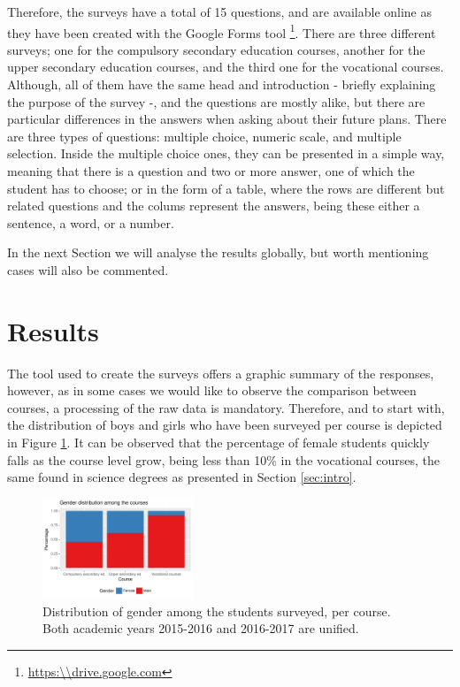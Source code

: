 \documentclass[journal,transmag]{IEEEtran}
\begin{document}
Therefore, the surveys have a total of 15 questions, and are available online as they have been created with the Google Forms tool \footnote{\url{https:\\drive.google.com}}. There are three different surveys; one for the compulsory secondary education courses, another for the upper secondary education courses, and the third one for the vocational courses. Although, all of them have the same head and introduction - briefly explaining the purpose of the survey -\cite{cohen2013research}, and the questions are mostly alike, but there are particular differences in the answers when asking about their future plans. There are three types of questions: multiple choice, numeric scale, and multiple selection. Inside the multiple choice ones, they can be presented in a simple way, meaning that there is a question and two or more answer, one of which the student has to choose; or in the form of a table, where the rows are different but related questions and the colums represent the answers, being these either a sentence, a word, or a number.

In the next Section we will analyse the results globally, but worth mentioning cases will also be commented.

\section{Results}
\label{sec:results}

The tool used to create the surveys offers a graphic summary of the responses, however, as in some cases we would like to observe the comparison between courses, a processing of the raw data is mandatory. Therefore, and to start with, the distribution of boys and girls who have been surveyed per course is depicted in Figure \ref{fig:alumni}. It can be observed that the percentage of female students quickly falls as the course level grow, being less than 10\% in the vocational courses, the same found in science degrees as presented in Section \ref{sec:intro}.

\begin{figure}
  \centering
  \includegraphics[width=0.4\textwidth]{img/gender_distribution.pdf}
  \caption{Distribution of gender among the students surveyed, per course. Both academic years 2015-2016 and 2016-2017 are unified.}
  \label{fig:alumni}
\end{figure}
\end{document}
